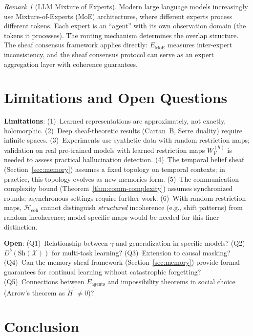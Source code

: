 \documentclass[11pt,a4paper]{article}
\theoremstyle{plain}
\theoremstyle{definition}
\theoremstyle{remark}
\newtheorem{remark}[theorem]{Remark}
\newcommand{\cX}{\mathcal{X}}
\newcommand{\Hcoh}{\mathcal{H}_{\mathrm{coh}}}
\newcommand{\CechH}{\check{H}}
\begin{document}
\begin{remark}[LLM Mixture of Experts]\label{rem:moe}
Modern large language models increasingly use Mixture-of-Experts (MoE) architectures, where different experts process different tokens. Each expert is an ``agent'' with its own observation domain (the tokens it processes). The routing mechanism determines the overlap structure. The sheaf consensus framework applies directly: $E_{\mathrm{MoE}}$ measures inter-expert inconsistency, and the sheaf consensus protocol can serve as an expert aggregation layer with coherence guarantees.
\end{remark}

\section{Limitations and Open Questions}\label{sec:limits}

\textbf{Limitations}: (1)~Learned representations are approximately, not exactly, holomorphic. (2)~Deep sheaf-theoretic results (Cartan~B, Serre duality) require infinite spaces. (3)~Experiments use synthetic data with random restriction maps; validation on real pre-trained models with learned restriction maps $W_V^{(h)}$ is needed to assess practical hallucination detection. (4)~The temporal belief sheaf (Section~\ref{sec:memory}) assumes a fixed topology on temporal contexts; in practice, this topology evolves as new memories form. (5)~The communication complexity bound (Theorem~\ref{thm:comm-complexity}) assumes synchronized rounds; asynchronous settings require further work. (6)~With random restriction maps, $\Hcoh$ cannot distinguish \emph{structured} incoherence (e.g., shift patterns) from random incoherence; model-specific maps would be needed for this finer distinction.

\textbf{Open}: (Q1)~Relationship between $\gamma$ and generalization in specific models? (Q2)~$D^b(\mathrm{Sh}(\cX))$ for multi-task learning? (Q3)~Extension to causal masking? (Q4)~Can the memory sheaf framework (Section~\ref{sec:memory}) provide formal guarantees for continual learning without catastrophic forgetting? (Q5)~Connections between $E_{\mathrm{agents}}$ and impossibility theorems in social choice (Arrow's theorem as $\CechH^1 \neq 0$)?

\section{Conclusion}
\end{document}
